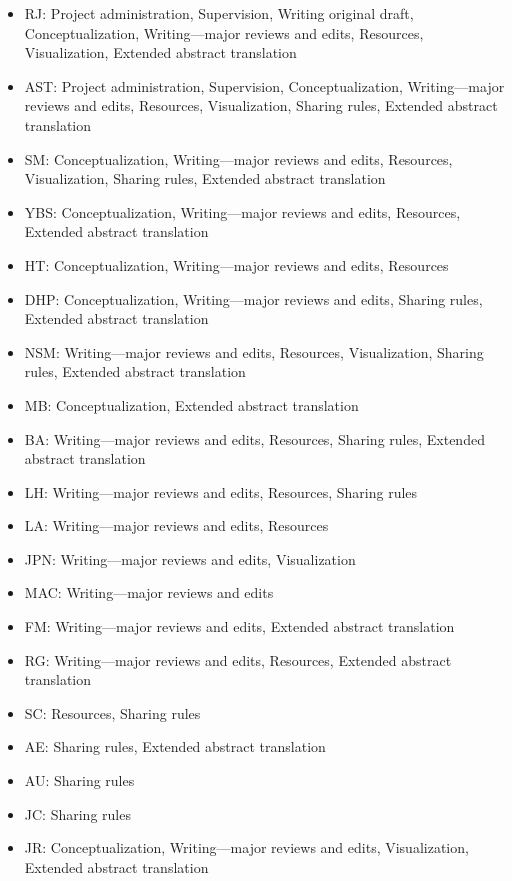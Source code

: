 \documentclass[10pt,letterpaper]{article}
\begin{document}
\begin{itemize}
    \item RJ: Project administration, Supervision, Writing original draft, Conceptualization, Writing---major reviews and edits, Resources, Visualization, Extended abstract translation
    \item AST: Project administration, Supervision, Conceptualization,  Writing---major reviews and edits, Resources, Visualization, Sharing rules, Extended abstract translation
    \item SM: Conceptualization, Writing---major reviews and edits, Resources, Visualization, Sharing rules, Extended abstract translation
    \item YBS: Conceptualization, Writing---major reviews and edits, Resources, Extended abstract translation
    \item HT: Conceptualization, Writing---major reviews and edits, Resources
    \item DHP: Conceptualization, Writing---major reviews and edits, Sharing rules, Extended abstract translation
    \item NSM: Writing---major reviews and edits, Resources, Visualization, Sharing rules, Extended abstract translation
    \item MB: Conceptualization, Extended abstract translation
    \item BA: Writing---major reviews and edits, Resources, Sharing rules, Extended abstract translation
    \item LH: Writing---major reviews and edits, Resources, Sharing rules
    \item LA: Writing---major reviews and edits, Resources
    \item JPN: Writing---major reviews and edits, Visualization
    \item MAC: Writing---major reviews and edits
    \item FM: Writing---major reviews and edits, Extended abstract translation
    \item RG: Writing---major reviews and edits, Resources, Extended abstract translation
    \item SC: Resources, Sharing rules
    \item AE: Sharing rules, Extended abstract translation
    \item AU: Sharing rules
    \item JC: Sharing rules
    \item JR: Conceptualization, Writing---major reviews and edits, Visualization, Extended abstract translation
\end{itemize}
\end{document}
